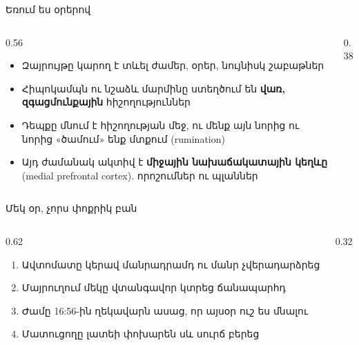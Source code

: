 \begin{frame}{Եռում ես օրերով}
  \begin{columns}[c]
    \begin{column}{0.56\textwidth}
      \begin{itemize}
        \item Զայրույթը կարող է տևել ժամեր, օրեր, նույնիսկ շաբաթներ
        \item<2-> Հիպոկամպն ու նշաձև մարմինը ստեղծում են \textbf{վառ, զգացմունքային} հիշողություններ
        \item<3-> Դեպքը մնում է հիշողության մեջ, ու մենք այն նորից ու նորից «ծամում» ենք մտքում (rumination)
        \item<4-> Այդ ժամանակ ակտիվ է \textbf{միջային նախաճակատային կեղևը} (medial prefrontal cortex). որոշումներ ու պլաններ
      \end{itemize}
    \end{column}
    \begin{column}{0.38\textwidth}
      \centering
    \end{column}
  \end{columns}
\end{frame}

\begin{frame}{Մեկ օր, չորս փոքրիկ բան}
  \begin{columns}[c]
    \begin{column}{0.62\textwidth}
      \begin{enumerate}
        \item Ավտոմատը կերավ մանրադրամդ ու մանր չվերադարձրեց
        \item<2-> Մայրուղում մեկը վտանգավոր կտրեց ճանապարհդ
        \item<3-> Ժամը 16:56-ին ղեկավարն ասաց, որ այսօր ուշ ես մնալու
        \item<4-> Մատուցողը լատեի փոխարեն սև սուրճ բերեց
      \end{enumerate}
      \vspace{1mm}
    \end{column}
    \begin{column}{0.32\textwidth}
      \centering
      \scalebox{0.85}{}
    \end{column}
  \end{columns}
\end{frame}

